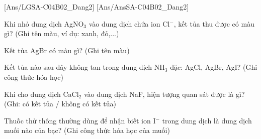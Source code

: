 \documentclass[Main.tex]{subfiles}
\begin{document}
    [Ans/LGSA-C04B02_Dang2]
    [Ans/AnsSA-C04B02_Dang2]
    \begin{bt}
        Khi nhỏ dung dịch AgNO$_3$ vào dung dịch chứa ion Cl$^-$, kết tủa thu được có màu gì? (Ghi tên màu, ví dụ: xanh, đỏ,...)
    \end{bt}
    \begin{bt}
        Kết tủa AgBr có màu gì? (Ghi tên màu)
    \end{bt}
    \begin{bt}
        Kết tủa nào sau đây không tan trong dung dịch NH$_3$ đặc: AgCl, AgBr, AgI? (Ghi công thức hóa học)
    \end{bt}
    \begin{bt}
        Khi cho dung dịch CaCl$_2$ vào dung dịch NaF, hiện tượng quan sát được là gì? (Ghi: có kết tủa / không có kết tủa)
    \end{bt}
    \begin{bt}
        Thuốc thử thông thường dùng để nhận biết ion I$^-$ trong dung dịch là dung dịch muối nào của bạc? (Ghi công thức hóa học của muối)
    \end{bt}
    
\end{document}
